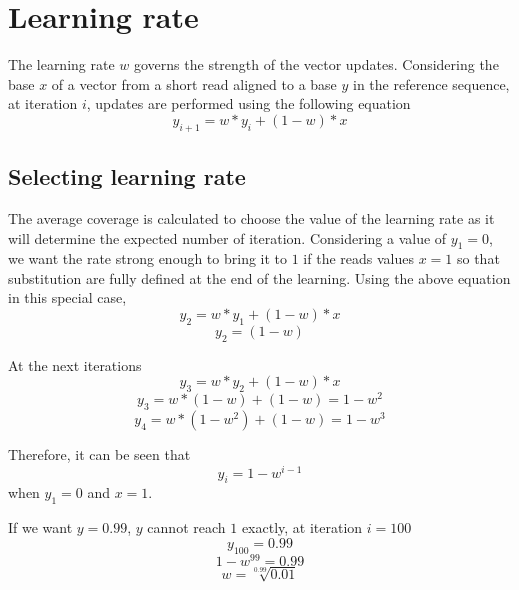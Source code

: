 \documentclass[12pt]{article}\usepackage[]{graphicx}\usepackage[]{color}
\begin{document}
\section{Learning rate}

The learning rate $w$ governs the strength of the vector updates.
Considering the base $x$ of a vector from a short read aligned to a base $y$ in the reference sequence, at iteration $i$, updates are performed using the following equation
\begin{equation*}
y_{i+1}=w*y_{i}+(1-w)*x
\end{equation*}


\subsection{Selecting learning rate}
The average coverage is calculated to choose the value of the learning rate as it will determine the expected number of iteration.
Considering a value of $y_{1}=0$, we want the rate strong enough to bring it to $1$ if the reads values $x=1$ so that substitution are fully defined at the end of the learning.
Using the above equation in this special case,
\begin{equation*}
y_{2}=w*y_{1}+(1-w)*x
\end{equation*}
\begin{equation*}
y_{2}=(1-w)
\end{equation*}

At the next iterations
\begin{equation*}
y_{3}=w*y_{2}+(1-w)*x
\end{equation*}
\begin{equation*}
y_{3}=w*(1-w)+(1-w)=1-w^{2}
\end{equation*}
\begin{equation*}
y_{4}=w*(1-w^{2})+(1-w)=1-w^{3}
\end{equation*}

Therefore, it can be seen that
\begin{equation*}
y_{i}=1-w^{i-1}
\end{equation*}
when $y_{1}=0$ and $x=1$.

If we want $y=0.99$, $y$ cannot reach $1$ exactly, at iteration $i=100$
\begin{equation*}
y_{100}=0.99
\end{equation*}
\begin{equation*}
1-w^{99}=0.99
\end{equation*}
\begin{equation*}
w=\sqrt[0.99]{0.01}
\end{equation*}
\end{document}
